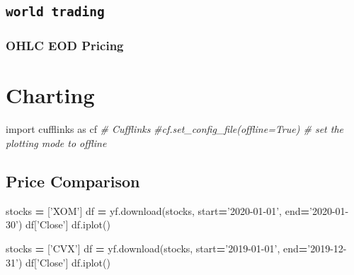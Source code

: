 \documentclass[
]{book}
\newenvironment{Shaded}{\begin{snugshade}}{\end{snugshade}}
\newcommand{\CommentTok}[1]{\textcolor[rgb]{0.37,0.37,0.37}{\textit{#1}}}
\newcommand{\ImportTok}[1]{#1}
\newcommand{\NormalTok}[1]{#1}
\newcommand{\OperatorTok}[1]{\textcolor[rgb]{0.43,0.43,0.43}{\textbf{#1}}}
\newcommand{\StringTok}[1]{\textcolor[rgb]{0.5,0.5,0.5}{#1}}
\begin{document}
\hypertarget{world-trading}{%
\subsection{\texorpdfstring{\texttt{world\ trading}}{world trading}}\label{world-trading}}

\hypertarget{ohlc-eod-pricing-2}{%
\subsubsection{OHLC EOD Pricing}\label{ohlc-eod-pricing-2}}

\hypertarget{charting}{%
\section{Charting}\label{charting}}

\begin{Shaded}
\begin{Highlighting}[]
\ImportTok{import}\NormalTok{ cufflinks }\ImportTok{as}\NormalTok{ cf  }\CommentTok{# Cufflinks}
\CommentTok{#cf.set_config_file(offline=True)  # set the plotting mode to offline}
\end{Highlighting}
\end{Shaded}

\hypertarget{price-comparison}{%
\subsection{Price Comparison}\label{price-comparison}}

\begin{Shaded}
\begin{Highlighting}[]
\NormalTok{stocks }\OperatorTok{=}\NormalTok{ [}\StringTok{'XOM'}\NormalTok{]}
\NormalTok{df }\OperatorTok{=}\NormalTok{ yf.download(stocks, start}\OperatorTok{=}\StringTok{'2020-01-01'}\NormalTok{, end}\OperatorTok{=}\StringTok{'2020-01-30'}\NormalTok{)}
\NormalTok{df[}\StringTok{'Close'}\NormalTok{]}
\NormalTok{df.iplot()}
\end{Highlighting}
\end{Shaded}

\begin{Shaded}
\begin{Highlighting}[]
\NormalTok{stocks }\OperatorTok{=}\NormalTok{ [}\StringTok{'CVX'}\NormalTok{]}
\NormalTok{df }\OperatorTok{=}\NormalTok{ yf.download(stocks, start}\OperatorTok{=}\StringTok{'2019-01-01'}\NormalTok{, end}\OperatorTok{=}\StringTok{'2019-12-31'}\NormalTok{)}
\NormalTok{df[}\StringTok{'Close'}\NormalTok{]}
\NormalTok{df.iplot()}
\end{Highlighting}
\end{Shaded}
\end{document}
